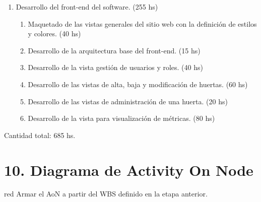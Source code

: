 \documentclass[
11pt, %
codirector, %
]{charter}
\begin{document}
\begin{enumerate}
\item Desarrollo del front-end del software. (255 hs)
	\begin{enumerate}
	\item Maquetado de las vistas generales del sitio web con la definición de estilos y colores. (40 hs)
	\item Desarrollo de la arquitectura base del front-end. (15 hs)
	\item Desarrollo de la vista gestión de usuarios y roles. (40 hs)
	\item Desarrollo de las vistas de alta, baja y modificación de huertas. (60 hs)
	\item Desarrollo de las vistas de administración de una huerta. (20 hs)
	\item Desarrollo de la vista para visualización de métricas. (80 hs)
	\end{enumerate}
\end{enumerate}

Cantidad total: 685 hs.

\section{10. Diagrama de Activity On Node}
\label{sec:AoN}

\begin{consigna}{red}
Armar el AoN a partir del WBS definido en la etapa anterior. 



\end{consigna}
\end{document}
